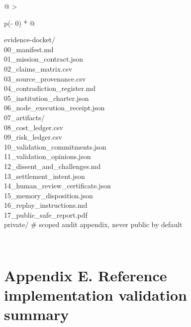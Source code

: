 \begin{longtable}[]{@{}
  >{\raggedright\arraybackslash}p{(\columnwidth - 0\tabcolsep) * }@{}}
\toprule\noalign{}
\begin{minipage}[b]{\linewidth}\raggedright
evidence-docket/\\
00\_\allowbreak{}manifest.md\\
01\_\allowbreak{}mission\_\allowbreak{}contract.json\\
02\_\allowbreak{}claims\_\allowbreak{}matrix.csv\\
03\_\allowbreak{}source\_\allowbreak{}provenance.csv\\
04\_\allowbreak{}contradiction\_\allowbreak{}register.md\\
05\_\allowbreak{}institution\_\allowbreak{}charter.json\\
06\_\allowbreak{}node\_\allowbreak{}execution\_\allowbreak{}receipt.json\\
07\_\allowbreak{}artifacts/\\
08\_\allowbreak{}cost\_\allowbreak{}ledger.csv\\
09\_\allowbreak{}risk\_\allowbreak{}ledger.csv\\
10\_\allowbreak{}validation\_\allowbreak{}commitments.json\\
11\_\allowbreak{}validation\_\allowbreak{}opinions.json\\
12\_\allowbreak{}dissent\_\allowbreak{}and\_\allowbreak{}challenges.md\\
13\_\allowbreak{}settlement\_\allowbreak{}intent.json\\
14\_\allowbreak{}human\_\allowbreak{}review\_\allowbreak{}certificate.json\\
15\_\allowbreak{}memory\_\allowbreak{}disposition.json\\
16\_\allowbreak{}replay\_\allowbreak{}instructions.md\\
17\_\allowbreak{}public\_\allowbreak{}safe\_\allowbreak{}report.pdf\\
private/ \# scoped audit appendix, never public by default\strut
\end{minipage} \\
\midrule\noalign{}
\endhead
\bottomrule\noalign{}
\endlastfoot
\end{longtable}

\section{Appendix E. Reference implementation validation
summary}\label{appendix-e.-reference-implementation-validation-summary}

